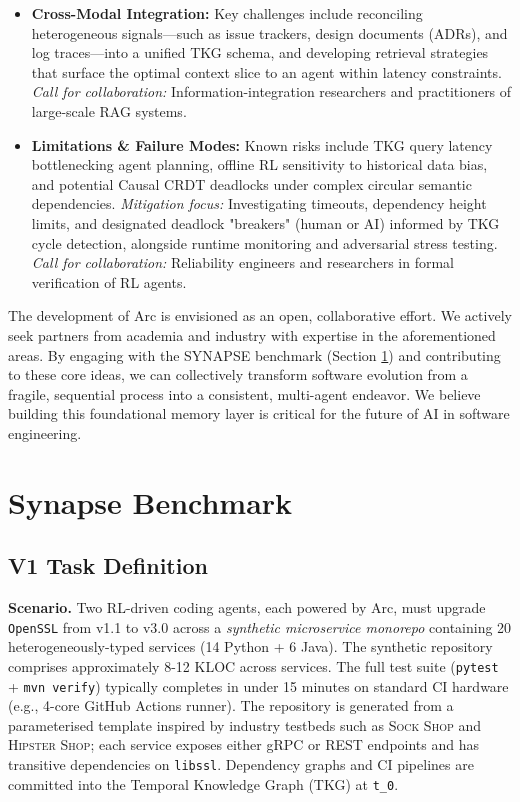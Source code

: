 \documentclass{article}
\begin{document}
\begin{itemize}
  \item \textbf{Cross-Modal Integration:} Key challenges include reconciling heterogeneous signals—such as issue trackers, design documents (ADRs), and log traces—into a unified TKG schema, and developing retrieval strategies that surface the optimal context slice to an agent within latency constraints. \emph{Call for collaboration:} Information-integration researchers and practitioners of large-scale RAG systems.

  \item \textbf{Limitations \& Failure Modes:} Known risks include TKG query latency bottlenecking agent planning, offline RL sensitivity to historical data bias, and potential Causal CRDT deadlocks under complex circular semantic dependencies. \emph{Mitigation focus:} Investigating timeouts, dependency height limits, and designated deadlock "breakers" (human or AI) informed by TKG cycle detection, alongside runtime monitoring and adversarial stress testing. \emph{Call for collaboration:} Reliability engineers and researchers in formal verification of RL agents.
\end{itemize}

The development of Arc is envisioned as an open, collaborative effort. We actively seek partners from academia and industry with expertise in the aforementioned areas. By engaging with the SYNAPSE benchmark (Section \ref{sec:synapse}) and contributing to these core ideas, we can collectively transform software evolution from a fragile, sequential process into a consistent, multi-agent endeavor. We believe building this foundational memory layer is critical for the future of AI in software engineering.

\section{Synapse Benchmark}
\label{sec:synapse}

\subsection{V1 Task Definition}
\textbf{Scenario.}
Two RL-driven coding agents, each powered by Arc, must upgrade \texttt{OpenSSL} from v1.1 to v3.0 across a \emph{synthetic microservice monorepo} containing 20 heterogeneously-typed services (14 Python + 6 Java).  The synthetic repository comprises approximately 8-12 KLOC across services. The full test suite (\texttt{pytest} + \texttt{mvn verify}) typically completes in under 15 minutes on standard CI hardware (e.g., 4-core GitHub Actions runner).
The repository is generated from a parameterised template inspired by industry testbeds such as \textsc{Sock Shop} and \textsc{Hipster Shop}; each service exposes either gRPC or REST endpoints and has transitive dependencies on \texttt{libssl}.  Dependency graphs and CI pipelines are committed into the Temporal Knowledge Graph (TKG) at \texttt{t\_0}.
\end{document}

